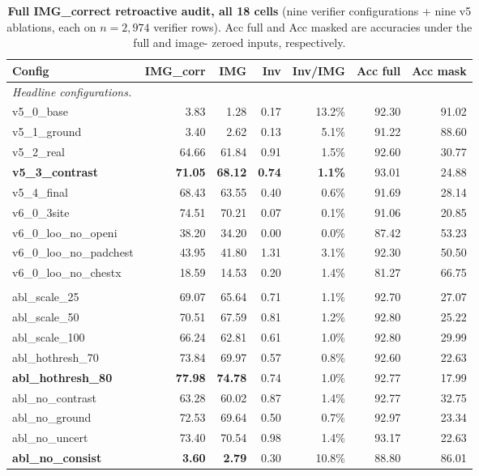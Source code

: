 \documentclass{article}
\begin{document}
\begin{table}[t]
\centering
\small
\caption{\textbf{Full IMG\_correct retroactive audit, all 18 cells} (nine
verifier configurations + nine v5 ablations, each on $n=2{,}974$ verifier
rows). Acc full and Acc masked are accuracies under the full and image-
zeroed inputs, respectively.}
\label{tab:audit-full}
\setlength{\tabcolsep}{4.0pt}
\begin{tabular}{lrrrrrr}
\toprule
\textbf{Config} & \textbf{IMG\_corr} & \textbf{IMG} & \textbf{Inv} & \textbf{Inv/IMG} & \textbf{Acc full} & \textbf{Acc mask}\\
\midrule
\multicolumn{7}{l}{\emph{Headline configurations.}}\\
v5\_0\_base                   & 3.83  & 1.28  & 0.17 & 13.2\% & 92.30 & 91.02\\
v5\_1\_ground                 & 3.40  & 2.62  & 0.13 & \phantom{0}5.1\% & 91.22 & 88.60\\
v5\_2\_real                   & 64.66 & 61.84 & 0.91 & \phantom{0}1.5\% & 92.60 & 30.77\\
\textbf{v5\_3\_contrast}      & \textbf{71.05} & \textbf{68.12} & \textbf{0.74} & \textbf{1.1\%} & 93.01 & 24.88\\
v5\_4\_final                  & 68.43 & 63.55 & 0.40 & \phantom{0}0.6\% & 91.69 & 28.14\\
v6\_0\_3site                  & 74.51 & 70.21 & 0.07 & \phantom{0}0.1\% & 91.06 & 20.85\\
v6\_0\_loo\_no\_openi         & 38.20 & 34.20 & 0.00 & \phantom{0}0.0\% & 87.42 & 53.23\\
v6\_0\_loo\_no\_padchest      & 43.95 & 41.80 & 1.31 & \phantom{0}3.1\% & 92.30 & 50.50\\
v6\_0\_loo\_no\_chestx        & 18.59 & 14.53 & 0.20 & \phantom{0}1.4\% & 81.27 & 66.75\\
\addlinespace
\multicolumn{7}{l}{\emph{v5 ablations.}}\\
abl\_scale\_25                & 69.07 & 65.64 & 0.71 & \phantom{0}1.1\% & 92.70 & 27.07\\
abl\_scale\_50                & 70.51 & 67.59 & 0.81 & \phantom{0}1.2\% & 92.80 & 25.22\\
abl\_scale\_100               & 66.24 & 62.81 & 0.61 & \phantom{0}1.0\% & 92.80 & 29.99\\
abl\_hothresh\_70             & 73.84 & 69.97 & 0.57 & \phantom{0}0.8\% & 92.60 & 22.63\\
\textbf{abl\_hothresh\_80}    & \textbf{77.98} & \textbf{74.78} & 0.74 & \phantom{0}1.0\% & 92.77 & 17.99\\
abl\_no\_contrast             & 63.28 & 60.02 & 0.87 & \phantom{0}1.4\% & 92.77 & 32.75\\
abl\_no\_ground               & 72.53 & 69.64 & 0.50 & \phantom{0}0.7\% & 92.97 & 23.34\\
abl\_no\_uncert               & 73.40 & 70.54 & 0.98 & \phantom{0}1.4\% & 93.17 & 22.63\\
\textbf{abl\_no\_consist}     & \textbf{\phantom{0}3.60}  & \textbf{\phantom{0}2.79}  & 0.30 & \phantom{0}10.8\% & 88.80 & 86.01\\
\bottomrule
\end{tabular}
\end{table}
\end{document}
